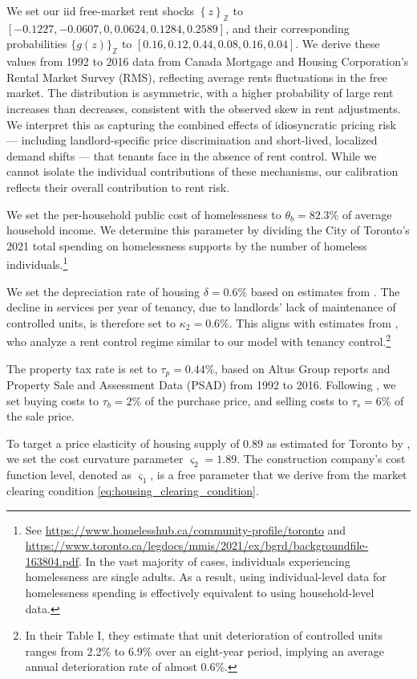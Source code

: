 \documentclass[parskip=full]{article}
\begin{document}
We set our iid free-market rent shocks $\left\{z\right\}_{\mathbb{Z}}$ to $\left[-0.1227,-0.0607,0,0.0624,0.1284,0.2589\right]$, and their corresponding probabilities $\{g(z)\}_{\mathbb{Z}}$ to $\left[0.16,0.12,0.44,0.08,0.16,0.04\right]$. We derive these values from 1992 to 2016 data from Canada Mortgage and Housing Corporation's Rental Market Survey (RMS), reflecting average rents fluctuations in the free market. The distribution is asymmetric, with a higher probability of large rent increases than decreases, consistent with the observed skew in rent adjustments. We interpret this as capturing the combined effects of idiosyncratic pricing risk — including landlord-specific price discrimination and short-lived, localized demand shifts — that tenants face in the absence of rent control. While we cannot isolate the individual contributions of these mechanisms, our calibration reflects their overall contribution to rent risk.

We set the per-household public cost of homelessness to $\theta_{b}=82.3\%$ of average household income. We determine this parameter by dividing the City of Toronto's 2021 total spending on homelessness supports by the number of homeless individuals.\footnote{See \url{https://www.homelesshub.ca/community-profile/toronto} and \url{https://www.toronto.ca/legdocs/mmis/2021/ex/bgrd/backgroundfile-163804.pdf}. In the vast majority of cases, individuals experiencing homelessness are single adults. As a result, using individual-level data for homelessness spending is effectively equivalent to using household-level data.}

We set the depreciation rate of housing $\delta=0.6\%$ based on estimates from \citet{rosenthal-2014}. The decline in services per year of tenancy, due to landlords' lack of maintenance of controlled units, is therefore set to $\kappa_{2}=0.6\%$. This aligns with estimates from \citet{murray_et_al-1991}, who analyze a rent control regime similar to our model with tenancy control.\footnote{In their Table I, they estimate that unit deterioration of controlled units ranges from 2.2\% to 6.9\% over an eight-year period, implying an average annual deterioration rate of almost 0.6\%.}

The property tax rate is set to $\tau_p=0.44\%$, based on Altus Group reports and Property Sale and Assessment Data (PSAD) from 1992 to 2016. Following \citet{gm-2003}, we set buying costs to $\tau_{b}=2\%$ of the purchase price, and selling costs to $\tau_{s}=6\% $ of the sale price.

To target a price elasticity of housing supply of 0.89 as estimated for Toronto by \citet{piaxao-2021}, we set the cost curvature parameter $\varsigma_{2}=1.89$. The construction company's cost function level, denoted as $\varsigma_1$, is a free parameter that we derive from the market clearing condition \eqref{eq:housing_clearing_condition}.
\end{document}
